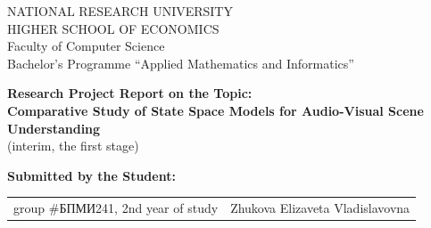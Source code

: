 \begin{titlepage}
\newpage

{
\begin{center}
NATIONAL RESEARCH UNIVERSITY\\
HIGHER SCHOOL OF ECONOMICS
\\
\bigskip
Faculty of Computer Science\\
Bachelor’s Programme “Applied Mathematics and Informatics”
\end{center}
}

\vspace{2em}
\vspace{4em}

\begin{center}
{\bf Research Project Report on the Topic:}\\
{\bf Comparative Study of State Space Models for Audio-Visual Scene Understanding}\\
(interim, the first stage)
\end{center}

\vspace{2em}

{\bf Submitted by the Student: \vspace{2mm}}

{
\begin{tabular}{l@{\hskip 1.5cm}l}
group \#\foreignlanguage{russian}{БПМИ}241, 2nd year of study & 
Zhukova Elizaveta Vladislavovna \\
\end{tabular}}



\end{titlepage}
